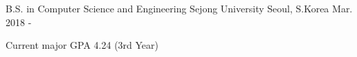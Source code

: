 

\begin{cventries}

  \cventry
    {B.S. in Computer Science and Engineering} %
    {Sejong University} %
    {Seoul, S.Korea} %
    {Mar. 2018 - } %
    {
      \begin{cvitems} %
        \item {Current major GPA 4.24 (3rd Year)}
      \end{cvitems}
    }

\end{cventries}
